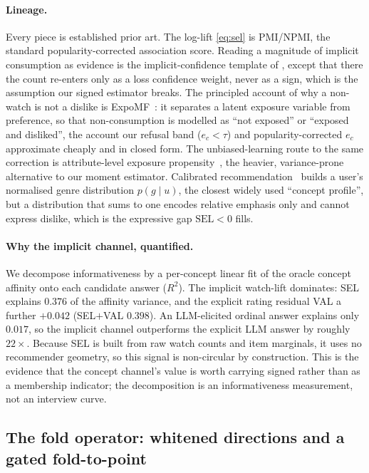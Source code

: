 \documentclass[manuscript,screen,review]{acmart}
\begin{document}
\paragraph{Lineage.} Every piece is established prior art. The log-lift \eqref{eq:sel} is PMI/NPMI, the standard popularity-corrected association score. Reading a magnitude of implicit consumption as evidence is the implicit-confidence template of \citet{hu2008collaborative}, except that there the count re-enters only as a loss confidence weight, never as a sign, which is the assumption our signed estimator breaks. The principled account of why a non-watch is not a dislike is ExpoMF~\citep{liang2016expomf}: it separates a latent exposure variable from preference, so that non-consumption is modelled as ``not exposed'' or ``exposed and disliked'', the account our refusal band ($e_c<\tau$) and popularity-corrected $e_c$ approximate cheaply and in closed form. The unbiased-learning route to the same correction is attribute-level exposure propensity~\citep{qin2020attributepropensity}, the heavier, variance-prone alternative to our moment estimator. Calibrated recommendation~\citep{steck2018calibrated} builds a user's normalised genre distribution $p(g\mid u)$, the closest widely used ``concept profile'', but a distribution that sums to one encodes relative emphasis only and cannot express dislike, which is the expressive gap $\mathrm{SEL}<0$ fills.

\paragraph{Why the implicit channel, quantified.} We decompose informativeness by a per-concept linear fit of the oracle concept affinity onto each candidate answer ($R^2$). The implicit watch-lift dominates: SEL explains $0.376$ of the affinity variance, and the explicit rating residual VAL a further $+0.042$ (SEL$+$VAL $0.398$). An LLM-elicited ordinal answer explains only $0.017$, so the implicit channel outperforms the explicit LLM answer by roughly $22\times$. Because SEL is built from raw watch counts and item marginals, it uses no recommender geometry, so this signal is non-circular by construction. This is the evidence that the concept channel's value is worth carrying signed rather than as a membership indicator; the decomposition is an informativeness measurement, not an interview curve.

\subsection{The fold operator: whitened directions and a gated fold-to-point}\label{sec:concept:fold}
\end{document}
